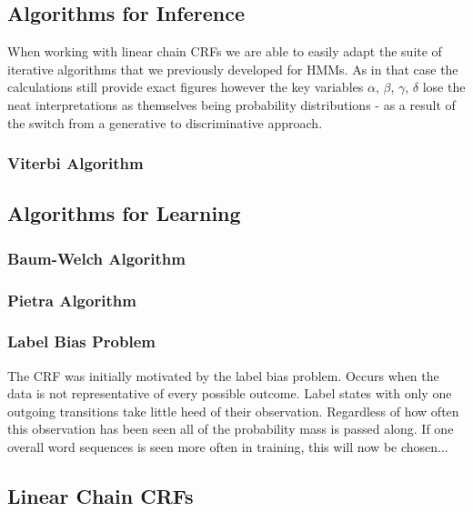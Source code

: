 \documentclass[../main.tex]{subfiles}
\begin{document}
\subsection{Algorithms for Inference}

When working with linear chain CRFs we are able to easily adapt the suite of iterative algorithms that we previously developed for HMMs.
As in that case the calculations still provide exact figures however the key variables $\alpha$, $\beta$, $\gamma$, $\delta$ lose the neat interpretations as themselves being probability distributions - as a result of the switch from a generative to discriminative approach.

\subsubsection{Viterbi Algorithm}
\subsection{Algorithms for Learning}
\subsubsection{Baum-Welch Algorithm}
\subsubsection{Pietra Algorithm}



\subsubsection{Label Bias Problem}

The CRF was initially motivated by the label bias problem.
Occurs when the data is not representative of every possible outcome.
Label states with only one outgoing transitions take little heed of their observation.
Regardless of how often this observation has been seen all of the probability mass is passed along.
If one overall word sequences is seen more often in training, this will now be chosen...

\subsection{Linear Chain CRFs}
\end{document}

